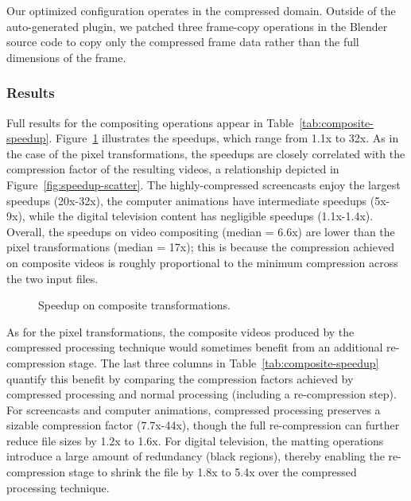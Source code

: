 Our optimized configuration operates in the compressed domain.
Outside of the auto-generated plugin, we patched three frame-copy
operations in
the Blender source code to copy only the compressed frame data rather
than the full dimensions of the frame.

\subsubsection{Results}

Full results for the compositing operations appear in
Table~\ref{tab:composite-speedup}.  Figure~\ref{fig:composite-speedup}
illustrates the speedups, which range from 1.1x to 32x.  As in the
case of the pixel transformations, the speedups are closely correlated
with the compression factor of the resulting videos, a relationship
depicted in Figure~\ref{fig:speedup-scatter}.  The highly-compressed
screencasts enjoy the largest speedups (20x-32x), the computer
animations have intermediate speedups (5x-9x), while the digital
television content has negligible speedups (1.1x-1.4x).  Overall, the
speedups on video compositing (median = 6.6x) are lower than the pixel
transformations (median = 17x); this is because the compression
achieved on composite videos is roughly proportional to the minimum
compression across the two input files.

\begin{figure}[t]
\caption{Speedup on composite transformations.
\protect\label{fig:composite-speedup}}
\end{figure}

As for the pixel transformations, the composite videos produced by the
compressed processing technique would sometimes benefit from an
additional re-compression stage.  The last three columns in
Table~\ref{tab:composite-speedup} quantify this benefit by comparing
the compression factors achieved by compressed processing and normal
processing (including a re-compression step).  For screencasts and
computer animations, compressed processing preserves a sizable
compression factor (7.7x-44x), though the full re-compression can
further reduce file sizes by 1.2x to 1.6x.  For digital television,
the matting operations introduce a large amount of redundancy (black
regions), thereby enabling the re-compression stage to shrink the file
by 1.8x to 5.4x over the compressed processing technique.

